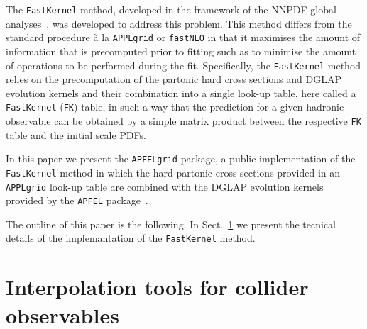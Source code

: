 \documentclass[preprint,12pt]{elsarticle}
\begin{document}
The {\tt FastKernel} method, developed in the framework of
the NNPDF global analyses~\cite{Ball:2010de}, was developed to address
this problem. This method differs from the standard procedure \`{a} la {\tt APPLgrid} or {\tt fastNLO} in that it
maximises the amount of information that is precomputed prior to fitting such as to minimise the amount
of operations to be performed during the fit. Specifically, the {\tt FastKernel} method relies on the precomputation
of the partonic hard cross sections and DGLAP evolution kernels
and their combination into a single look-up table, here called a {\tt FastKernel} ({\tt FK}) table, in such a way that the prediction for a given hadronic
observable can be obtained by a simple matrix product between
the respective {\tt FK} table and the initial scale PDFs.

In this paper we present the {\tt APFELgrid} package, a public implementation of the {\tt
  FastKernel} method in which the hard partonic cross sections provided in an {\tt APPLgrid} look-up table are combined with the DGLAP
evolution kernels provided by the {\tt APFEL}
package~\cite{Bertone:2013vaa}.

The outline of this paper is the following. In
Sect.~\ref{sec:FastKernel} we present the tecnical details of the
implemantation of the {\tt FastKernel} method.

\section{Interpolation tools for collider observables}\label{sec:FastKernel}
\end{document}
